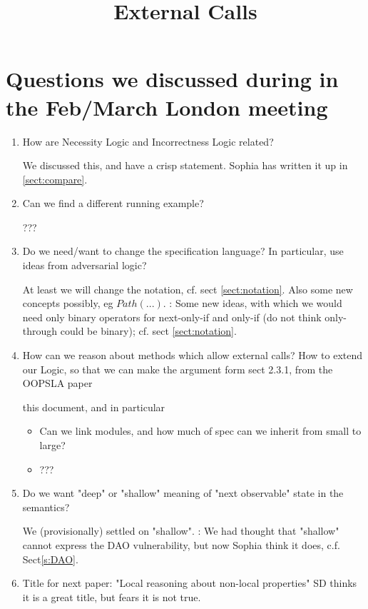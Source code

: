 \documentclass[11pt]{article} %
\title{External Calls}
\date{} %
\theoremstyle{definition}
\begin{document}
\maketitle

\section{Questions we discussed during in the Feb/March London meeting}

\begin{enumerate}
\item
How are Necessity Logic and Incorrectness Logic related?

We discussed this, and have a crisp statement. Sophia has written it up in \ref{sect:compare}.

\item
Can we find a different running example?

??? 
\item
Do we need/want to change  the specification language? In particular, use ideas from adversarial logic?

At least we will change the notation, cf. sect \ref{sect:notation}. Also some new concepts possibly, eg $Path(...)$.
\SP: Some new ideas, with which we would   need only binary operators for next-only-if and only-if (do not think only-through could be binary); cf. sect \ref{sect:notation}. 

\item
How can we reason about methods which allow external calls? 
How to extend our Logic, so that we can make the argument form sect 2.3.1, from the OOPSLA paper


this document, and in particular

\begin{itemize}
\item
Can we link  modules, and how much of spec can we inherit  from small to large?
\item 
???
\end{itemize}

\item
Do we want "deep" or "shallow" meaning of "next observable" state in the semantics?

We (provisionally) settled on "shallow". \SP: We had thought that "shallow" cannot express the DAO vulnerability, but now Sophia think it does, c.f. Sect\ref{s:DAO}.

\item
Title for next paper: "Local reasoning about non-local properties" SD thinks it is a great title, but fears it is not true.


\end{enumerate}
\end{document}

